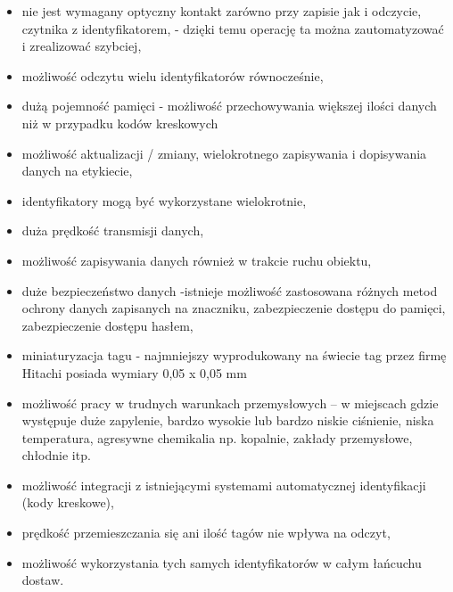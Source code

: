 \begin{itemize}\setlength{\itemsep}{0pt}
	\item nie jest wymagany optyczny kontakt zarówno przy zapisie jak i odczycie, czytnika z identyfikatorem, - dzięki temu operację ta można zautomatyzować i zrealizować szybciej,
	
	\item możliwość odczytu wielu identyfikatorów równocześnie,
	
	\item dużą  pojemność pamięci  - możliwość przechowywania większej ilości danych niż w przypadku kodów kreskowych

	\item możliwość aktualizacji / zmiany, wielokrotnego zapisywania i dopisywania danych  na etykiecie,

	\item identyfikatory mogą być wykorzystane wielokrotnie,

	\item duża prędkość transmisji danych,

	\item możliwość zapisywania danych również w trakcie ruchu obiektu,

	\item duże bezpieczeństwo danych -istnieje możliwość zastosowana różnych metod ochrony danych zapisanych na znaczniku, zabezpieczenie dostępu do pamięci, zabezpieczenie dostępu hasłem,  

	\item miniaturyzacja tagu  - najmniejszy wyprodukowany na świecie tag przez firmę Hitachi posiada wymiary 0,05 x 0,05 mm

	\item możliwość pracy w trudnych warunkach przemysłowych –  w miejscach gdzie występuje duże zapylenie, bardzo wysokie lub bardzo niskie ciśnienie, niska temperatura, agresywne chemikalia np. kopalnie, zakłady przemysłowe, chłodnie itp.

	\item możliwość integracji z istniejącymi systemami automatycznej identyfikacji (kody kreskowe),

	\item prędkość przemieszczania się ani ilość tagów nie wpływa na odczyt,

	\item możliwość wykorzystania tych samych identyfikatorów w całym łańcuchu dostaw.

\end{itemize}

